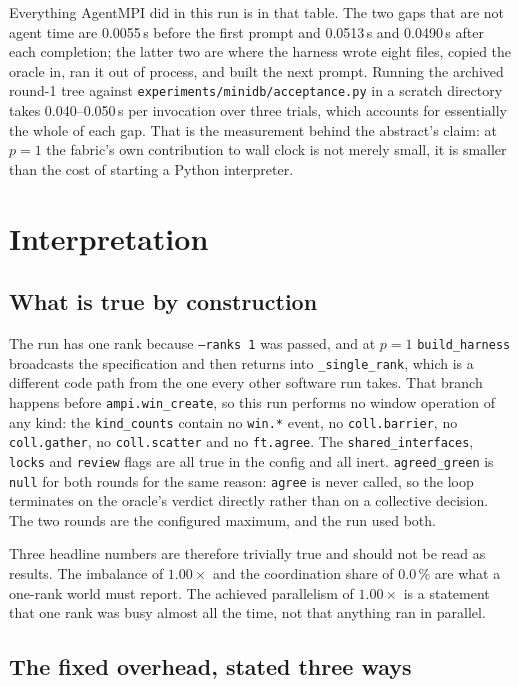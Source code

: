 \documentclass[11pt]{article}
\begin{document}
Everything AgentMPI did in this run is in that table. The two gaps that are not agent time
are 0.0055\,s before the first prompt and 0.0513\,s and 0.0490\,s after each completion; the
latter two are where the harness wrote eight files, copied the oracle in, ran it out of
process, and built the next prompt. Running the archived round-1 tree against
\texttt{experiments/minidb/acceptance.py} in a scratch directory takes 0.040--0.050\,s per
invocation over three trials, which accounts for essentially the whole of each gap. That is
the measurement behind the abstract's claim: at $p=1$ the fabric's own contribution to wall
clock is not merely small, it is smaller than the cost of starting a Python interpreter.

\section{Interpretation}

\subsection*{What is true by construction}

The run has one rank because \texttt{--ranks 1} was passed, and at $p=1$
\texttt{build\_harness} broadcasts the specification and then returns into
\texttt{\_single\_rank}, which is a different code path from the one every other software run
takes. That branch happens before \texttt{ampi.win\_create}, so this run performs no window
operation of any kind: the \texttt{kind\_counts} contain no \texttt{win.*} event, no
\texttt{coll.barrier}, no \texttt{coll.gather}, no \texttt{coll.scatter} and no
\texttt{ft.agree}. The \texttt{shared\_interfaces}, \texttt{locks} and \texttt{review} flags
are all true in the config and all inert. \texttt{agreed\_green} is \texttt{null} for both
rounds for the same reason: \texttt{agree} is never called, so the loop terminates on the
oracle's verdict directly rather than on a collective decision. The two rounds are the
configured maximum, and the run used both.

Three headline numbers are therefore trivially true and should not be read as results. The
imbalance of $1.00\times$ and the coordination share of 0.0\,\% are what a one-rank world
must report. The achieved parallelism of $1.00\times$ is a statement that one rank was busy
almost all the time, not that anything ran in parallel.

\subsection*{The fixed overhead, stated three ways}
\end{document}
